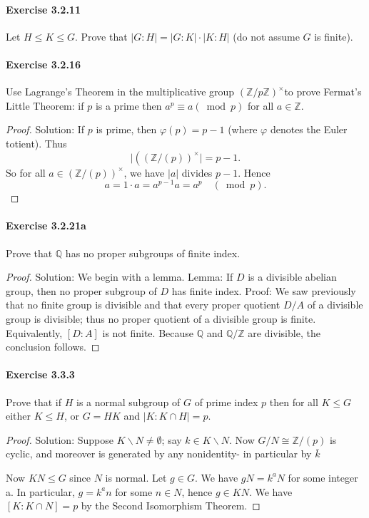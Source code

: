 \documentclass{article}
\theoremstyle{definition}
\begin{document}
\paragraph{Exercise 3.2.11} Let $H \leq K \leq G$. Prove that $|G: H|=|G: K| \cdot|K: H|$ (do not assume $G$ is finite).

\paragraph{Exercise 3.2.16} Use Lagrange's Theorem in the multiplicative group $(\mathbb{Z} / p \mathbb{Z})^{\times}$to prove Fermat's Little Theorem: if $p$ is a prime then $a^{p} \equiv a(\bmod p)$ for all $a \in \mathbb{Z}$.
\begin{proof}
    Solution: If $p$ is prime, then $\varphi(p)=p-1$ (where $\varphi$ denotes the Euler totient). Thus
$$
\mid\left((\mathbb{Z} /(p))^{\times} \mid=p-1 .\right.
$$
So for all $a \in(\mathbb{Z} /(p))^{\times}$, we have $|a|$ divides $p-1$. Hence
$$
a=1 \cdot a=a^{p-1} a=a^p \quad(\bmod p) .
$$
\end{proof}


\paragraph{Exercise 3.2.21a} Prove that $\mathbb{Q}$ has no proper subgroups of finite index.
\begin{proof}
    Solution: We begin with a lemma.
Lemma: If $D$ is a divisible abelian group, then no proper subgroup of $D$ has finite index.
Proof: We saw previously that no finite group is divisible and that every proper quotient $D / A$ of a divisible group is divisible; thus no proper quotient of a divisible group is finite. Equivalently, $[D: A]$ is not finite.
Because $\mathbb{Q}$ and $\mathbb{Q} / \mathbb{Z}$ are divisible, the conclusion follows.
\end{proof}


\paragraph{Exercise 3.3.3} Prove that if $H$ is a normal subgroup of $G$ of prime index $p$ then for all $K \leq G$ either $K \leq H$, or $G=H K$ and $|K: K \cap H|=p$.
\begin{proof}
    Solution: Suppose $K \backslash N \neq \emptyset$; say $k \in K \backslash N$. Now $G / N \cong \mathbb{Z} /(p)$ is cyclic, and moreover is generated by any nonidentity- in particular by $\bar{k}$

Now $K N \leq G$ since $N$ is normal. Let $g \in G$. We have $g N=k^a N$ for some integer a. In particular, $g=k^a n$ for some $n \in N$, hence $g \in K N$. We have $[K: K \cap N]=p$ by the Second Isomorphism Theorem.
\end{proof}
\end{document}
